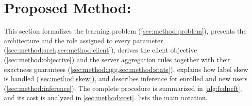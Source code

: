 \section{Proposed Method: \method}\label{sec:method}

This section formalizes the learning problem (\cref{sec:method:problem}), presents the
architecture and the role assigned to every parameter (\cref{sec:method:arch,sec:method:client}),
derives the client objective (\cref{sec:method:objective}) and the server aggregation rules
together with their exactness guarantees (\cref{sec:method:agg,sec:method:stats}), explains how
label skew is handled (\cref{sec:method:skew}), and describes inference for enrolled and new
users (\cref{sec:method:inference}). The complete procedure is summarized in \cref{alg:fedpeft},
and its cost is analyzed in \cref{sec:method:cost}.  lists the main notation.

